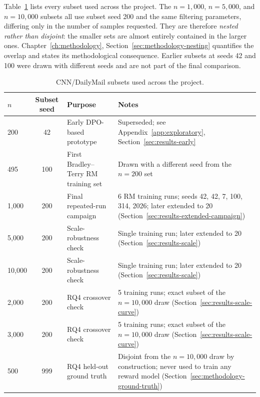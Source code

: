 Table~\ref{tab:impl-subsets} lists every subset used across the project. The
$n=1{,}000$, $n=5{,}000$, and $n=10{,}000$ subsets all use subset seed 200 and the
same filtering parameters, differing only in the number of samples requested. They
are therefore \emph{nested rather than disjoint}: the smaller sets are almost
entirely contained in the larger ones. Chapter~\ref{ch:methodology},
Section~\ref{sec:methodology-nesting} quantifies the overlap and states its
methodological consequence. Earlier subsets at seeds 42 and 100 were drawn with
different seeds and are not part of the final comparison.

\begin{table}[htbp]
\centering
\caption[CNN/DailyMail subsets used across the project]{CNN/DailyMail subsets used across the project.}
\label{tab:impl-subsets}
\begin{tabularx}{\textwidth}{lclX}
\toprule
$n$ & Subset seed & Purpose & Notes \\
\midrule
200    & 42  & Early DPO-based prototype & Superseded; see
  Appendix~\ref{app:exploratory}, Section~\ref{sec:results-early} \\
495    & 100 & First Bradley--Terry RM training set & Drawn with a different seed
  from the $n=200$ set \\
1{,}000 & 200 & Final repeated-run campaign & 6 RM training runs; seeds 42, 42, 7, 100,
  314, 2026; later extended to 20 (Section~\ref{sec:results-extended-campaign}) \\
5{,}000 & 200 & Scale-robustness check & Single training run; later extended to 20
  (Section~\ref{sec:results-scale}) \\
10{,}000 & 200 & Scale-robustness check & Single training run; later extended to 20
  (Section~\ref{sec:results-scale}) \\
2{,}000 & 200 & RQ4 crossover check & 5 training runs; exact subset of the
  $n=10{,}000$ draw (Section~\ref{sec:results-scale-curve}) \\
3{,}000 & 200 & RQ4 crossover check & 5 training runs; exact subset of the
  $n=10{,}000$ draw (Section~\ref{sec:results-scale-curve}) \\
500 & 999 & RQ4 held-out ground truth & Disjoint from the $n=10{,}000$ draw by
  construction; never used to train any reward model
  (Section~\ref{sec:methodology-ground-truth}) \\
\bottomrule
\end{tabularx}
\end{table}

